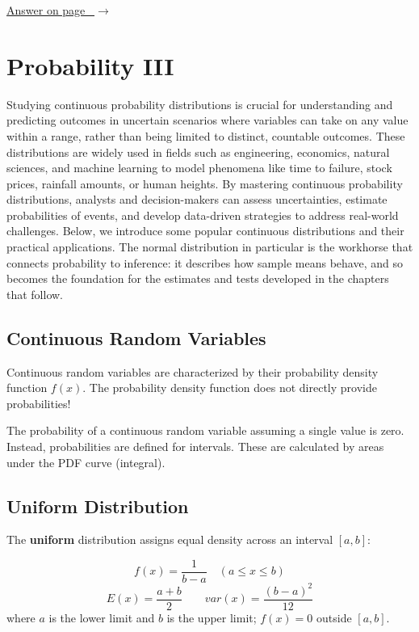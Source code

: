 \documentclass[
  11pt,
  letterpaper,
  DIV=11,
  numbers=noendperiod,
  oneside,
  open=any]{scrreprt}
\newcommand{\bsanswerref}[1]{%
  \par\nopagebreak\hypertarget{q-#1}{}\label{q-#1}%
  {\raggedleft\sffamily\footnotesize\hyperlink{a-#1}{\textcolor{bsaccent}{Answer on page \pageref{a-#1}\ $\rightarrow$}}\par}%
  \medskip}
\begin{document}
\bsanswerref{bsans96}

\chapter{Probability III}\label{probability-iii}

Studying continuous probability distributions is crucial for
understanding and predicting outcomes in uncertain scenarios where
variables can take on any value within a range, rather than being
limited to distinct, countable outcomes. These distributions are widely
used in fields such as engineering, economics, natural sciences, and
machine learning to model phenomena like time to failure, stock prices,
rainfall amounts, or human heights. By mastering continuous probability
distributions, analysts and decision-makers can assess uncertainties,
estimate probabilities of events, and develop data-driven strategies to
address real-world challenges. Below, we introduce some popular
continuous distributions and their practical applications. The normal
distribution in particular is the workhorse that connects probability to
inference: it describes how sample means behave, and so becomes the
foundation for the estimates and tests developed in the chapters that
follow.

\section{Continuous Random Variables}\label{continuous-random-variables}

Continuous random variables are characterized by their probability
density function \(f(x)\). The probability density function does not
directly provide probabilities!

The probability of a continuous random variable assuming a single value
is zero. Instead, probabilities are defined for intervals. These are
calculated by areas under the PDF curve (integral).

\section{Uniform Distribution}\label{uniform-distribution}

The \textbf{uniform} distribution assigns equal density across an
interval \([a,b]\):

\begin{bsformula}

\[f(x)= \frac {1}{b-a} \quad (a \leq x \leq b)\]
\[E(x)= \frac {a+b}{2} \qquad var(x)= \frac {(b-a)^2}{12}\] where \(a\)
is the lower limit and \(b\) is the upper limit; \(f(x)=0\) outside
\([a,b]\).

\end{bsformula}
\end{document}
